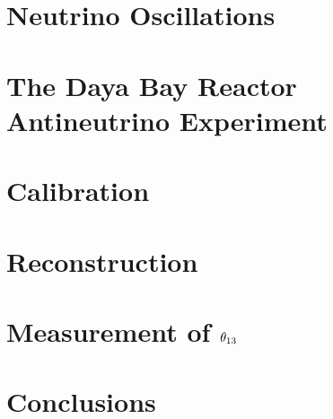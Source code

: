 \documentclass{ucbthesis}
\begin{document}
\listoftodos

\chapter{Neutrino Oscillations}

\chapter{The Daya Bay Reactor Antineutrino Experiment}

\chapter{Calibration}

\chapter{Reconstruction}






\chapter{Measurement of \texorpdfstring{$\theta_{13}$}{theta13}}

\chapter{Conclusions}

\appendix


\end{document}
